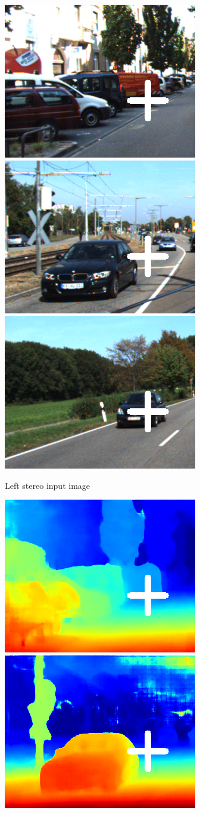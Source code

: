 \begin{figure}[p]
\clearpage
	\begin{center}
    		\begin{subfigure}[t]{\linewidth}
            \centering
            \includegraphics[width=0.32\linewidth,trim={0 0 0 1cm},clip]{saliency/000005_10_png_input.png}
            \includegraphics[width=0.32\linewidth,trim={0 0 0 1cm},clip]{saliency/000016_10_png_input.png}
            \includegraphics[width=0.32\linewidth,trim={0 0 0 1cm},clip]{saliency/000074_10_png_input.png}
	        \caption{Left stereo input image}
		\end{subfigure}
    		\begin{subfigure}[t]{\linewidth}
            \centering
            \includegraphics[width=0.32\linewidth,trim={0 0 0 1cm},clip]{saliency/000005_10_png_disparity.png}
            \includegraphics[width=0.32\linewidth,trim={0 0 0 1cm},clip]{saliency/000016_10_png_disparity.png}

\end{subfigure}
\end{center}
\end{figure}
